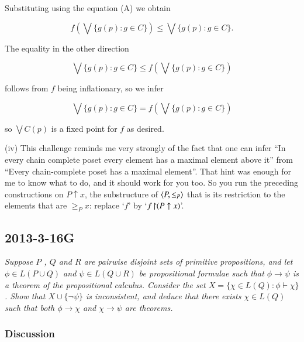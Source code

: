 \documentclass{book}
\begin{document}
Substituting using the equation (A) we obtain

$$f(\bigvee\{g(p): g\in C\}) \leq  \bigvee\{g(p): g\in C\}.$$

The equality in the other direction

$$\bigvee\{g(p): g\in C\} \leq f(\bigvee\{g(p): g\in C\})$$

follows from $f$ being inflationary, so we infer

$$\bigvee\{g(p): g\in C\} = f(\bigvee\{g(p): g\in C\})$$

so $\bigvee C(p)$ is a fixed point for $f$ as desired.

\medskip

(iv) This challenge reminds me very strongly of the fact that one can
infer ``In every chain complete poset every element has a maximal
element above it'' from ``Every chain-complete poset has a maximal
element''.  That hint was enough for me to know what to do, and it
should work for you too.  So you run the preceding constructions on $P
\uparrow x$, the substructure of $\mbox{$\langle P, \leq_P \rangle$}$ that is its
restriction to the elements that are $\geq_P x$: replace `$f$' by
`$f\kern-2pt\upharpoonright\kern-3pt (P \uparrow x)$'.

\subsection*{2013-3-16G}




{\sl Suppose $P$ , $Q$ and $R$ are pairwise disjoint sets of primitive
  propositions, and let $\phi\in L(P \cup Q)$ and $\psi \in L(Q \cup
  R)$ be propositional formulae such that $\phi \to \psi$ is a theorem
  of the propositional calculus. Consider the set $X = \{\chi \in L(Q)
    : \phi \vdash \chi\}$ .  Show that $X \cup \{\neg \psi\}$ is
    inconsistent, and deduce that there exists $\chi \in L(Q)$ such
    that both $\phi \to \chi$ and $\chi \to \psi$ are
    theorems.\begin{small} [Hint: assuming $X \cup \{\neg \psi\}$ is
      consistent, take a suitable valuation $v$ of $Q \cup R$ and show
      that $\{\phi\} \cup \{q \in Q | v(q) = 1\} \cup \{\neg q : q \in
    Q, v(q) = 0\}$ is inconsistent. The Deduction Theorem may be
    assumed without proof.]\end{small}}


\subsubsection*{Discussion}
\end{document}
